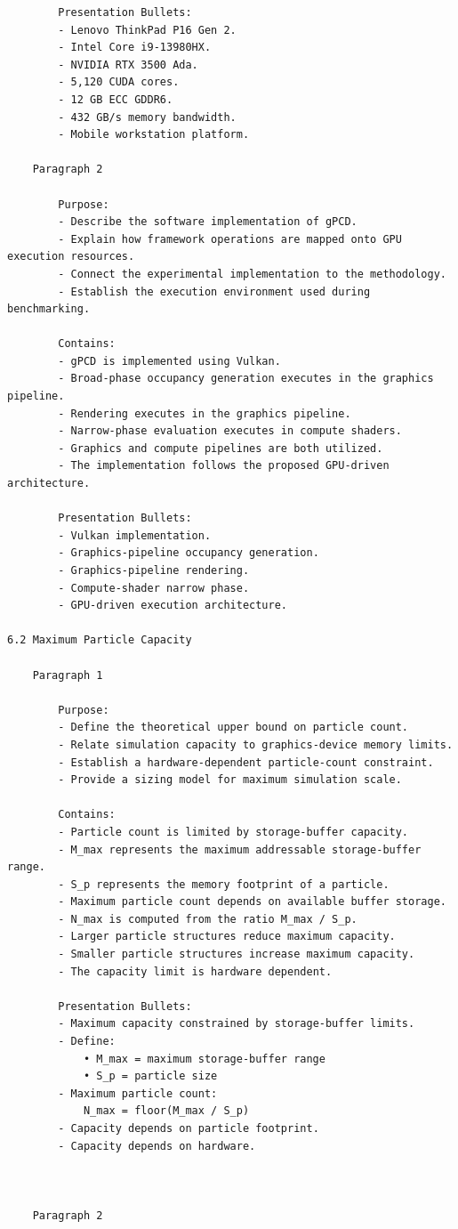 \begin{verbatim}
		Presentation Bullets:
		- Lenovo ThinkPad P16 Gen 2.
		- Intel Core i9-13980HX.
		- NVIDIA RTX 3500 Ada.
		- 5,120 CUDA cores.
		- 12 GB ECC GDDR6.
		- 432 GB/s memory bandwidth.
		- Mobile workstation platform.

	Paragraph 2

		Purpose:
		- Describe the software implementation of gPCD.
		- Explain how framework operations are mapped onto GPU execution resources.
		- Connect the experimental implementation to the methodology.
		- Establish the execution environment used during benchmarking.

		Contains:
		- gPCD is implemented using Vulkan.
		- Broad-phase occupancy generation executes in the graphics pipeline.
		- Rendering executes in the graphics pipeline.
		- Narrow-phase evaluation executes in compute shaders.
		- Graphics and compute pipelines are both utilized.
		- The implementation follows the proposed GPU-driven architecture.

		Presentation Bullets:
		- Vulkan implementation.
		- Graphics-pipeline occupancy generation.
		- Graphics-pipeline rendering.
		- Compute-shader narrow phase.
		- GPU-driven execution architecture.
	
6.2 Maximum Particle Capacity

	Paragraph 1

		Purpose:
		- Define the theoretical upper bound on particle count.
		- Relate simulation capacity to graphics-device memory limits.
		- Establish a hardware-dependent particle-count constraint.
		- Provide a sizing model for maximum simulation scale.

		Contains:
		- Particle count is limited by storage-buffer capacity.
		- M_max represents the maximum addressable storage-buffer range.
		- S_p represents the memory footprint of a particle.
		- Maximum particle count depends on available buffer storage.
		- N_max is computed from the ratio M_max / S_p.
		- Larger particle structures reduce maximum capacity.
		- Smaller particle structures increase maximum capacity.
		- The capacity limit is hardware dependent.

		Presentation Bullets:
		- Maximum capacity constrained by storage-buffer limits.
		- Define:
			• M_max = maximum storage-buffer range
			• S_p = particle size
		- Maximum particle count:
			N_max = floor(M_max / S_p)
		- Capacity depends on particle footprint.
		- Capacity depends on hardware.



	Paragraph 2


\end{verbatim}
